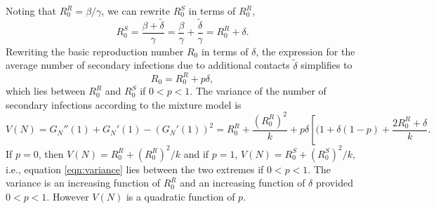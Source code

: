 \documentclass{imammb}
\numberwithin{equation}{section}
\begin{document}
Noting that $R_0^R = \beta/\gamma$,  we can rewrite $R_0^S$ in terms of $R_0^R$,
\begin{equation}
R_0^S = \frac{\beta + \tilde{\delta}}{\gamma} = \frac{\beta}{\gamma} + \frac{ \tilde{\delta}}{\gamma} = R_0^R + \delta. 
\end{equation}
Rewriting the basic reproduction number $R_0$ in terms of $\delta$, the expression for the average number of secondary infections due to additional contacts $\tilde{\delta}$ simplifies to 
\begin{equation}\label{eqn:R0delta}
R_0 = R_0^R + p \delta,
\end{equation}
which lies between $R_0^R$ and $R_0^S$ if $0<p<1$. 
The variance of the number of secondary infections according to the mixture model is %
\begin{equation}\label{eqn:variance}
V(N) = G_N''(1) + G_N'(1) -  (G_N'(1))^2= R_0^R + \frac{(R_0^R)^2}{k} + p \delta \left [ (1+ \delta(1-p) + \frac{2 R_0^R + \delta}{k}. 
\end{equation}
If $p=0$, then $V(N) = R_0^R + (R_0^R)^2/k$ and if $p=1$, $V(N) = R_0^S + (R_0^S)^2/k$, i.e., equation \eqref{eqn:variance} lies between the two extremes if $0<p<1$. The variance is an increasing function of $R_0^R$ and an increasing function of $\delta$ provided $0<p<1$. However $V(N)$ is a quadratic function of $p$.

\end{document}
